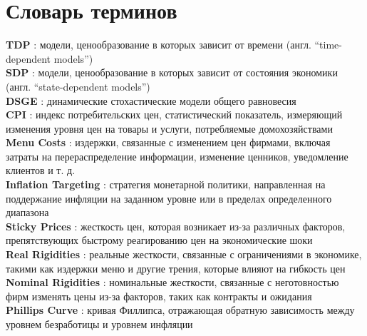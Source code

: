 \chapter*{Словарь терминов}             %
%
\textbf{TDP} : модели, ценообразование в которых зависит от времени (англ. ``time-dependent models'')\\

\textbf{SDP} : модели, ценообразование в которых зависит от состояния экономики (англ. ``state-dependent models'')\\

\textbf{DSGE} : динамические стохастические модели общего равновесия\\

\textbf{CPI} : индекс потребительских цен, статистический показатель, измеряющий изменения уровня цен на товары и услуги, потребляемые домохозяйствами\\

\textbf{Menu Costs} : издержки, связанные с изменением цен фирмами, включая затраты на перераспределение информации, изменение ценников, уведомление клиентов и т. д.\\

\textbf{Inflation Targeting} : стратегия монетарной политики, направленная на поддержание инфляции на заданном уровне или в пределах определенного диапазона\\

\textbf{Sticky Prices} : жесткость цен, которая возникает из-за различных факторов, препятствующих быстрому реагированию цен на экономические шоки\\

\textbf{Real Rigidities} : реальные жесткости, связанные с ограничениями в экономике, такими как издержки меню и другие трения, которые влияют на гибкость цен\\

\textbf{Nominal Rigidities} : номинальные жесткости, связанные с неготовностью фирм изменять цены из-за факторов, таких как контракты и ожидания\\

\textbf{Phillips Curve} : кривая Филлипса, отражающая обратную зависимость между уровнем безработицы и уровнем инфляции


%
